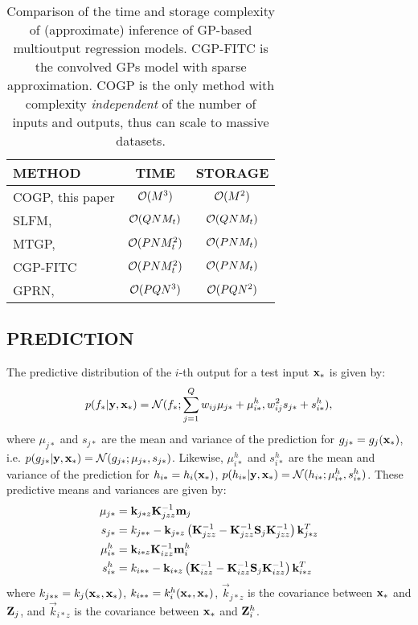 \setlength{\tabcolsep}{4pt}
\begin{table}[t]
\caption{Comparison of the time and storage complexity of (approximate) inference of GP-based multioutput regression models. CGP-FITC is the convolved GPs model with sparse approximation\citep{alvarez-lawrence-nips-08}. COGP is the only method with complexity \emph{independent} of the number of inputs and outputs, thus can scale to massive datasets.}
\label{tab:complexity}
\begin{center}
\small
\begin{tabular}{lcc}
\toprule
\textbf{METHOD} & \textbf{TIME} & \textbf{STORAGE} \\ \hline
COGP, this paper  & $\mathcal{O}(M^3)$ & $\mathcal{O}(M^2)$ \\
SLFM, \citep{teh-et-al-aistats-05} & $\mathcal{O}(QNM_t)$ & $\mathcal{O}(QNM_t)$ \\
MTGP, \citep{bonilla-et-al-nips-08} & $\mathcal{O}(PNM_t^2)$ & $\mathcal{O}(PNM_t)$\\ 
CGP-FITC & $\mathcal{O}(PNM_t^2)$ & $\mathcal{O}(PNM_t)$ \\
GPRN, \citep{wilson-et-al-icml-12} & $\mathcal{O}(PQN^3)$ & $\mathcal{O}(PQN^2)$ \\
\bottomrule
\end{tabular}
\end{center}
\end{table}

\subsection{PREDICTION}
The predictive distribution of the $i$-th output for a test input $\mathbf{x}_*$ is given by:
\begin{align}
p(f_* | \mathbf{y}, \mathbf{x}_*) = \mathcal{N}(f_*; \sum_{j=1}^Q w_{ij} \mu_{j*} + \mu^h_{i*}, w_{ij}^2 s_{j*} + s^h_{i*}), 
\end{align}
where $\mu_{j*}$ and $s_{j*}$ are the mean and variance of the prediction for $g_{j*} = g_j(\mathbf{x}_*)$, i.e. $p(g_{j*} | \mathbf{y}, \mathbf{x}_*) = \mathcal{N}(g_{j*}; \mu_{j*}, s_{j*})$.
Likewise, $\mu^h_{i*}$ and $s^h_{i*}$ are the mean and variance of the prediction for $h_{i*} = h_i(\mathbf{x}_*)$, $p(h_{i*} | \mathbf{y}, \mathbf{x}_*) = \mathcal{N}(h_{i*}; \mu^h_{i*}, s^h_{i*})$.
These predictive means and variances are given by: 
\begin{align}
\mu_{j*} &= \mathbf{k}_{j*z} \mathbf{K}_{jzz}^{-1} \mathbf{m}_j \\ s_{j*} &= k_{j**} - \mathbf{k}_{j*z} \left(\mathbf{K}_{jzz}^{-1} - \mathbf{K}_{jzz}^{-1} \mathbf{S}_j \mathbf{K}_{jzz}^{-1} \right) \mathbf{k}_{j*z}^T \\
\mu^h_{i*} &= \mathbf{k}_{i*z} \mathbf{K}_{izz}^{-1} \mathbf{m}^h_i \\
s^h_{i*} &= k_{i**} - \mathbf{k}_{i*z} \left(\mathbf{K}_{izz}^{-1} - \mathbf{K}_{izz}^{-1} \mathbf{S}_j \mathbf{K}_{izz}^{-1} \right) \mathbf{k}_{i*z}^T
\end{align}
where $k_{j**} = k_j(\mathbf{x}_*, \mathbf{x}_*)$, $k_{i**} = k^h_i(\mathbf{x}_*, \mathbf{x}_*)$,  $\vec{k}_{j*z}$ is the covariance between $\mathbf{x}_*$ and $\mathbf{Z}_j$, and $\vec{k}_{i*z}$ is the covariance between $\mathbf{x}_*$ and $\mathbf{Z}^h_i$.

